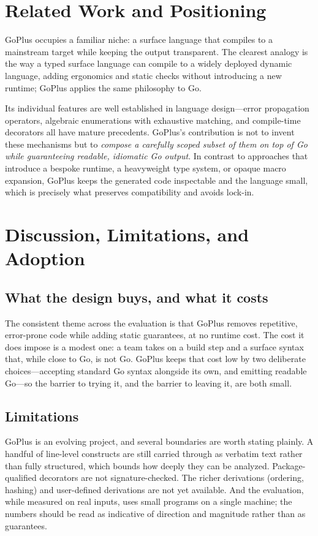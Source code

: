 \documentclass[11pt,a4paper]{article}
\begin{document}
\section{Related Work and Positioning}
GoPlus occupies a familiar niche: a surface language that compiles to a mainstream
target while keeping the output transparent. The clearest analogy is the way a
typed surface language can compile to a widely deployed dynamic language, adding
ergonomics and static checks without introducing a new runtime; GoPlus applies
the same philosophy to Go.

Its individual features are well established in language design---error
propagation operators, algebraic enumerations with exhaustive matching, and
compile-time decorators all have mature precedents. GoPlus's contribution is not
to invent these mechanisms but to \emph{compose a carefully scoped subset of them
on top of Go while guaranteeing readable, idiomatic Go output}. In contrast to
approaches that introduce a bespoke runtime, a heavyweight type system, or opaque
macro expansion, GoPlus keeps the generated code inspectable and the language
small, which is precisely what preserves compatibility and avoids lock-in.

\section{Discussion, Limitations, and Adoption}
\subsection{What the design buys, and what it costs}
The consistent theme across the evaluation is that GoPlus removes repetitive,
error-prone code while adding static guarantees, at no runtime cost. The cost it
does impose is a modest one: a team takes on a build step and a surface syntax
that, while close to Go, is not Go. GoPlus keeps that cost low by two deliberate
choices---accepting standard Go syntax alongside its own, and emitting readable
Go---so the barrier to trying it, and the barrier to leaving it, are both small.

\subsection{Limitations}
GoPlus is an evolving project, and several boundaries are worth stating plainly.
A handful of line-level constructs are still carried through as verbatim text
rather than fully structured, which bounds how deeply they can be analyzed.
Package-qualified decorators are not signature-checked. The richer derivations
(ordering, hashing) and user-defined derivations are not yet available. And the
evaluation, while measured on real inputs, uses small programs on a single
machine; the numbers should be read as indicative of direction and magnitude
rather than as guarantees.
\end{document}
